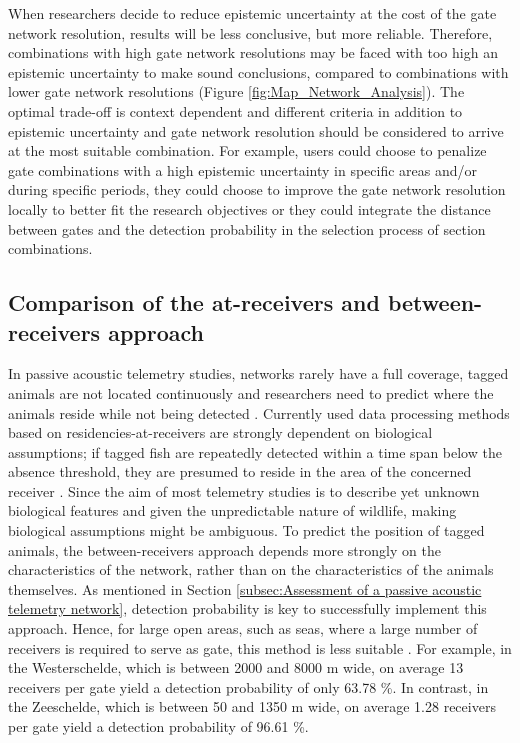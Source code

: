 \documentclass[preprint,12pt,authoryear]{elsarticle}
\begin{document}
\begin{spacing}{1.9}
When researchers decide to reduce epistemic uncertainty at the cost of the gate network resolution, results will be less conclusive, but more reliable. Therefore, combinations with high gate network resolutions may be faced with too high an epistemic uncertainty to make sound conclusions, compared to combinations with lower gate network resolutions (Figure \ref{fig:Map_Network_Analysis}). The optimal trade-off is context dependent and different criteria in addition to epistemic uncertainty and gate network resolution should be considered to arrive at the most suitable combination. For example, users could choose to penalize gate combinations with a high epistemic uncertainty in specific areas and/or during specific periods, they could choose to improve the gate network resolution locally to better fit the research objectives or they could integrate the distance between gates and the detection probability in the selection process of section combinations. 

\subsection{Comparison of the at-receivers and between-receivers approach}

In passive acoustic telemetry studies, networks rarely have a full coverage, tagged animals are not located continuously and researchers need to predict where the animals reside while not being detected \citep{Heupel2006,Hedger2008,Trancart2017}. Currently used data processing methods based on residencies-at-receivers are strongly dependent on biological assumptions; if tagged fish are repeatedly detected within a time span below the absence threshold, they are presumed to reside in the area of the concerned receiver \citep{Vokoun2003}. Since the aim of most telemetry studies is to describe yet unknown biological features \citep{Hussey2015} and given the unpredictable nature of wildlife, making biological assumptions might be ambiguous. To predict the position of tagged animals, the between-receivers approach depends more strongly on the characteristics of the network, rather than on the characteristics of the animals themselves. As mentioned in Section \ref{subsec:Assessment of a passive acoustic telemetry network}, detection probability is key to successfully implement this approach. Hence, for large open areas, such as seas, where a large number of receivers is required to serve as gate, this method is less suitable \citep{Hobday2011EstimatingArrays}. For example, in the Westerschelde, which is between 2000 and 8000 m wide, on average 13 receivers per gate yield a detection probability of only 63.78 \%. In contrast, in the Zeeschelde, which is between 50 and 1350 m wide, on average 1.28 receivers per gate yield a detection probability of 96.61 \%.  


\end{spacing}
\end{document}
